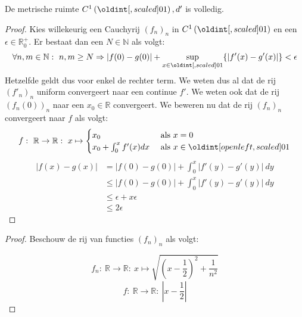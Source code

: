 \documentclass[main.tex]{subfiles}
\begin{document}
\begin{vb}
  De metrische ruimte $C^{1}\left(\interval{0}{1}\right),d'$ is volledig.

  \begin{proof}
    Kies willekeurig een Cauchyrij $(f_{n})_{n}$ in $C^{1}\left(\interval{0}{1}\right)$ en een $\epsilon\in\mathbb{R}_{0}^{+}$.
    Er bestaat dan een $N\in\mathbb{N}$ als volgt:
    \[
      \forall n,m\in\mathbb{N}:\ n,m\ge N \Rightarrow |f(0)-g(0)| + \sup_{x\in\interval{0}{1}}\{|f'(x)-g'(x)|\} < \epsilon
    \]
    Hetzelfde geldt dus voor enkel de rechter term.
    We weten dus al dat de rij $(f'_{n})_{n}$ uniform convergeert naar een continue $f'$.
    We weten ook dat de rij $(f_{n}(0))_{n}$ naar een $x_{0}\in\mathbb{R}$ convergeert.
    We beweren nu dat de rij $(f_{n})_{n}$ convergeert naar $f$ als volgt:
    \[
      f:\ \mathbb{R} \rightarrow \mathbb{R}:\ x \mapsto 
      \begin{cases}
        x_{0} &\text{ als } x = 0\\
        x_{0} + \int_{0}^{x}f'(x)dx &\text{ als } x \in \interval[open left]{0}{1}
      \end{cases}
    \]
    \begin{align*}
      |f(x)-g(x)|
      &= \left|f(0)-g(0)\right| + \int_{0}^{x}|f'(y)-g'(y)|\ dy\\
      &\le |f(0)-g(0)| + \int_{0}^{x}|f'(y)-g'(y)|\ dy\\
      &\le \epsilon + x\epsilon\\
      &\le 2\epsilon
    \end{align*}
  \end{proof}

  \iffalse
  \begin{proof}
    Beschouw de rij van functies $(f_{n})_{n}$ als volgt:

    \noindent
    \begin{minipage}{.45\textwidth}
      \begin{figure}[H]
        \centering
      \end{figure}
    \end{minipage}
    \begin{minipage}{.45\textwidth}
      \[ f_{n}:\ \mathbb{R} \rightarrow \mathbb{R}:\ x \mapsto \sqrt{\left(x-\frac{1}{2}\right)^{2}+ \frac{1}{n^{2}}} \]
      \[ f:\ \mathbb{R} \rightarrow \mathbb{R}:\ |x-\frac{1}{2}| \]
    \end{minipage}


\end{proof}
\end{vb}
\end{document}
